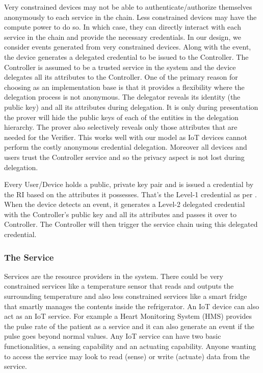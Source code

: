 \documentclass[journal]{IEEEtran}
\begin{document}
Very constrained devices may not be able to authenticate/authorize themselves anonymously to each service in the chain. Less constrained devices may have the compute power to do so. In which case, they can directly interact with each service in the chain and provide the necessary credentials. In our design, we consider events generated from very constrained devices. Along with the event, the device generates a delegated credential to be issued to the Controller. The Controller is assumed to be a trusted service in the system and the device delegates all its attributes to the Controller. One of the primary reason for choosing \citep{CamenischDD17} as an implementation base is that it provides a flexibility where the delegation process is not anonymous. The delegator reveals its identity (the public key) and all its attributes during delegation. It is only during presentation the prover will hide the public keys of each of the entities in the delegation hierarchy. The prover also selectively reveals only those attributes that are needed for the Verifier. This works well with our model as IoT devices cannot perform the costly anonymous credential delegation. Moreover all devices and users trust the Controller service and so the privacy aspect is not lost during delegation.

Every User/Device holds a public, private key pair and is issued a credential by the RI based on the attributes it possesses. That's the Level-1 credential as per \cite{CamenischDD17}. When the device detects an event, it generates a Level-2 delegated credential with the Controller's public key and all its attributes and passes it over to Controller. The Controller will then trigger the service chain using this delegated credential.

\subsubsection{The Service} \label{service}
Services are the resource providers in the system. There could be very constrained services like a temperature sensor that reads and outputs the surrounding temperature and also less constrained services like a smart fridge that smartly manages the contents inside the refrigerator. An IoT device can also act as an IoT service. For example a Heart Monitoring System (HMS) provides the pulse rate of the patient as a service and it can also generate an event if the pulse goes beyond normal values. Any IoT service can have two basic functionalities, a sensing capability and an actuating capability. Anyone wanting to access the service may look to read (sense) or write (actuate) data from the service.
\end{document}
